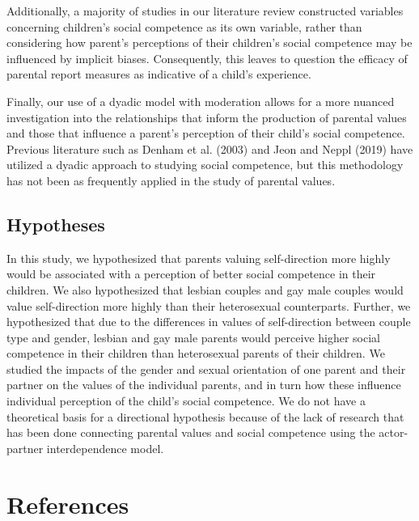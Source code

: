 \documentclass[man]{apa6}
\begin{document}
Additionally, a majority of studies in our literature review constructed variables concerning children's social competence as its own variable, rather than considering how parent's perceptions of their children's social competence may be influenced by implicit biases. Consequently, this leaves to question the efficacy of parental report measures as indicative of a child's experience.

Finally, our use of a dyadic model with moderation allows for a more nuanced investigation into the relationships that inform the production of parental values and those that influence a parent's perception of their child's social competence. Previous literature such as Denham et al. (2003) and Jeon and Neppl (2019) have utilized a dyadic approach to studying social competence, but this methodology has not been as frequently applied in the study of parental values.

\hypertarget{hypotheses}{%
\subsection{Hypotheses}\label{hypotheses}}

In this study, we hypothesized that parents valuing self-direction more highly would be associated with a perception of better social competence in their children. We also hypothesized that lesbian couples and gay male couples would value self-direction more highly than their heterosexual counterparts. Further, we hypothesized that due to the differences in values of self-direction between couple type and gender, lesbian and gay male parents would perceive higher social competence in their children than heterosexual parents of their children. We studied the impacts of the gender and sexual orientation of one parent and their partner on the values of the individual parents, and in turn how these influence individual perception of the child's social competence. We do not have a theoretical basis for a directional hypothesis because of the lack of research that has been done connecting parental values and social competence using the actor-partner interdependence model.

\newpage

\hypertarget{references}{%
\section{References}\label{references}}

\begingroup
\setlength{\parindent}{-0.5in}
\setlength{\leftskip}{0.5in}
\end{document}
